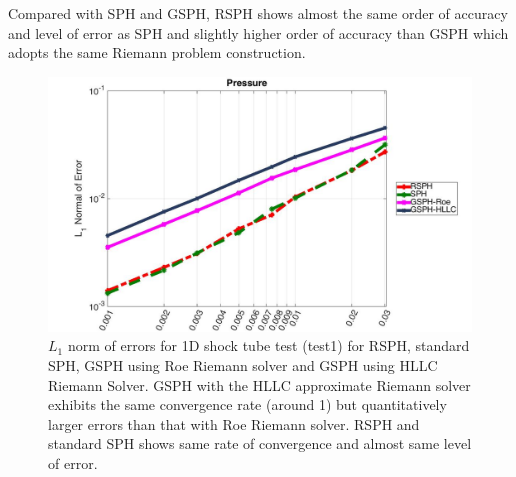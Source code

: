  Compared with SPH and GSPH, RSPH shows almost the same order of accuracy and level of error as SPH and slightly higher order of accuracy than GSPH which adopts the same Riemann problem construction.
 
\begin{figure}[H]
    \centering
    \begin{minipage}{.70\textwidth}
        \centering
        \includegraphics[width=0.99 \textwidth]{./Figures/Accuracy-pre}
    \end{minipage}%
    \caption{ $L_1$ norm of errors for 1D shock tube test (test1) for RSPH, standard SPH, GSPH using Roe Riemann solver and GSPH using HLLC Riemann Solver. GSPH with the HLLC approximate Riemann solver exhibits the same convergence rate (around 1) but quantitatively larger errors than that with Roe Riemann solver. RSPH and standard SPH shows same rate of convergence and almost same level of error.}
    \label{fig:Accuracy-test1}
\end{figure}
 
